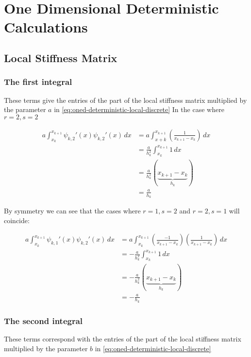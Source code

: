 \chapter{One Dimensional Deterministic Calculations}

\section{Local Stiffness Matrix}

\subsection{The first integral}

These terms give the entries of the part of the local stiffness matrix multiplied 
by the parameter $a$ in \ref{eq:oned-deterministic-local-discrete}
In the case where $r = 2, s = 2$

\begin{align*}
  a\int_{x_k}^{x_{k+1}}\psi_{k,2}'(x)\psi_{k,2}'(x)\, dx 
    &= a\int_{x+k}^{x_{k+1}}\left(\frac{1}{x_{k+1} - x_k}\right)\, dx \\
    &= \frac{a}{h_k^2}\int_{x_k}^{x_{k+1}}1\, dx \\
    &= \frac{a}{h_k^2}(\underbrace{x_{k+1} - x_k}_{h_k}) \\
    &= \frac{a}{h_k}
\end{align*}

By symmetry we can see that the cases where $r = 1, s = 2$ and $r = 2, s = 1$ will
coincide:

\begin{align*}
	a\int_{x_k}^{x_{k+1}}\psi_{k, 1}'(x)\psi_{k, 2}'(x)\, dx
      &= a\int_{x_k}^{x_{k+1}}\left(\frac{-1}{x_{k+1} - x_k}\right)
                              \left(\frac{1}{x_{k+1} - x_k}\right)\, dx \\
      &= -\frac{a}{h_k^2}\int_{x_k}^{x_{k+1}}1\, dx \\
      &= -\frac{a}{h_k^2}(\underbrace{x_{k+1} - x_k}_{h_k}) \\
      &= -\frac{a}{h_k}
\end{align*}

\subsection{The second integral}

These terms correspond with the entries of the part of the local stiffness matrix
multiplied by the parameter $b$ in \ref{eq:oned-deterministic-local-discrete}

